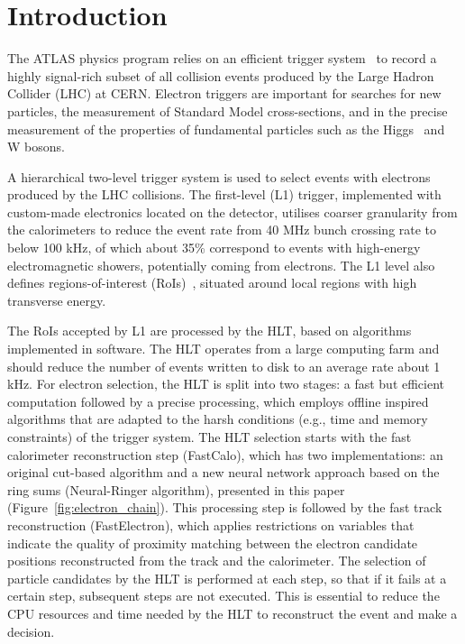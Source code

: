 \section{Introduction}


The ATLAS physics program relies on an efficient trigger system~\cite{aad2020performance} to record a highly signal-rich subset of all collision events produced by the Large Hadron Collider (LHC) at CERN. Electron triggers\cite{aaboud2019electron} are important for searches for new particles, the measurement of Standard Model cross-sections, and in the precise measurement of the properties of fundamental particles such as the Higgs~\cite{HIGG-2012-27,HIGG-2016-33} and W bosons.

A hierarchical two-level trigger system is used to select events with electrons produced by the LHC collisions. The first-level (L1) trigger, implemented with custom-made electronics located on the detector, utilises coarser granularity from the calorimeters to reduce the event rate from 40 MHz bunch crossing rate to below 100 kHz, of which about 35\% correspond to events with high-energy electromagnetic showers, potentially coming from electrons. The L1 level also defines regions-of-interest (RoIs)~\cite{CERN-LHCC-2017-020}, situated around local regions with high transverse energy. 

The RoIs accepted by L1 are processed by the HLT, based on algorithms implemented in software. The HLT operates from a large computing farm and should reduce the number of events written to disk to an average rate about 1 kHz.
For electron selection, the HLT is split into two stages: a fast but efficient computation followed by a precise processing, which employs offline inspired algorithms that are adapted to the harsh conditions (e.g., time and memory constraints) of the trigger system.  The HLT selection starts with the fast calorimeter reconstruction step (FastCalo), which has two implementations: an original cut-based algorithm and a new neural network approach based on the ring sums (Neural-Ringer algorithm), presented in this paper (Figure~\ref{fig:electron_chain}). 
This processing step is followed by the fast track reconstruction (FastElectron), which applies restrictions on variables that indicate the quality of proximity matching between the electron candidate positions reconstructed from the track and the calorimeter. The selection of particle candidates by the HLT is performed at each step, so that if it fails at a certain step, subsequent steps are not executed. This is essential to reduce the CPU resources and time needed by the HLT to reconstruct the event and make a decision. 


